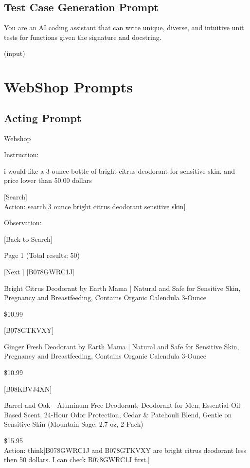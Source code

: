 {\subsection{Test Case Generation Prompt}

You are an AI coding assistant that can write unique, diverse, and intuitive unit tests for functions given the signature and docstring.

(input)

\section{WebShop Prompts}
\label{sec:webshop_prompt}
\subsection{Acting Prompt}

Webshop 

Instruction:  

i would like a 3 ounce bottle of bright citrus deodorant for sensitive skin, and price lower than 50.00 dollars 

[Search]  
\\

Action: search[3 ounce bright citrus deodorant sensitive skin]

Observation: 

[Back to Search] 

Page 1 (Total results: 50) 

[Next
] 
[B078GWRC1J] 

Bright Citrus Deodorant by Earth Mama | Natural and Safe for Sensitive Skin, Pregnancy and Breastfeeding, Contains Organic Calendula 3-Ounce 

\$10.99 

[B078GTKVXY] 

Ginger Fresh Deodorant by Earth Mama | Natural and Safe for Sensitive Skin, Pregnancy and Breastfeeding, Contains Organic Calendula 3-Ounce 

\$10.99 

[B08KBVJ4XN] 

Barrel and Oak - Aluminum-Free Deodorant, Deodorant for Men, Essential Oil-Based Scent, 24-Hour Odor Protection, Cedar \& Patchouli Blend, Gentle on Sensitive Skin (Mountain Sage, 2.7 oz, 2-Pack) 

\$15.95  
\\

Action: think[B078GWRC1J and B078GTKVXY are bright citrus deodorant less then 50 dollars. I can check B078GWRC1J first.]

}
